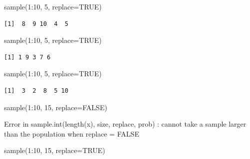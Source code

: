 \documentclass[
  letterpaper,
  DIV=11,
  numbers=noendperiod]{scrreprt}
\newenvironment{Shaded}{\begin{snugshade}}{\end{snugshade}}
\newcommand{\AttributeTok}[1]{\textcolor[rgb]{0.40,0.45,0.13}{#1}}
\newcommand{\ConstantTok}[1]{\textcolor[rgb]{0.56,0.35,0.01}{#1}}
\newcommand{\DecValTok}[1]{\textcolor[rgb]{0.68,0.00,0.00}{#1}}
\newcommand{\FunctionTok}[1]{\textcolor[rgb]{0.28,0.35,0.67}{#1}}
\newcommand{\NormalTok}[1]{\textcolor[rgb]{0.00,0.23,0.31}{#1}}
\newcommand{\SpecialCharTok}[1]{\textcolor[rgb]{0.37,0.37,0.37}{#1}}
\begin{document}
\begin{Shaded}
\begin{Highlighting}[]
\FunctionTok{sample}\NormalTok{(}\DecValTok{1}\SpecialCharTok{:}\DecValTok{10}\NormalTok{, }\DecValTok{5}\NormalTok{, }\AttributeTok{replace=}\ConstantTok{TRUE}\NormalTok{)}
\end{Highlighting}
\end{Shaded}

\begin{verbatim}
[1]  8  9 10  4  5
\end{verbatim}

\begin{Shaded}
\begin{Highlighting}[]
\FunctionTok{sample}\NormalTok{(}\DecValTok{1}\SpecialCharTok{:}\DecValTok{10}\NormalTok{, }\DecValTok{5}\NormalTok{, }\AttributeTok{replace=}\ConstantTok{TRUE}\NormalTok{)}
\end{Highlighting}
\end{Shaded}

\begin{verbatim}
[1] 1 9 3 7 6
\end{verbatim}

\begin{Shaded}
\begin{Highlighting}[]
\FunctionTok{sample}\NormalTok{(}\DecValTok{1}\SpecialCharTok{:}\DecValTok{10}\NormalTok{, }\DecValTok{5}\NormalTok{, }\AttributeTok{replace=}\ConstantTok{TRUE}\NormalTok{)}
\end{Highlighting}
\end{Shaded}

\begin{verbatim}
[1]  3  2  8  5 10
\end{verbatim}

\begin{Shaded}
\begin{Highlighting}[]
\FunctionTok{sample}\NormalTok{(}\DecValTok{1}\SpecialCharTok{:}\DecValTok{10}\NormalTok{, }\DecValTok{15}\NormalTok{, }\AttributeTok{replace=}\ConstantTok{FALSE}\NormalTok{)}
\end{Highlighting}
\end{Shaded}

{Error in sample.int(length(x), size, replace, prob) : cannot take a
sample larger than the population when \textquotesingle replace =
FALSE\textquotesingle{}}

\begin{Shaded}
\begin{Highlighting}[]
\FunctionTok{sample}\NormalTok{(}\DecValTok{1}\SpecialCharTok{:}\DecValTok{10}\NormalTok{, }\DecValTok{15}\NormalTok{, }\AttributeTok{replace=}\ConstantTok{TRUE}\NormalTok{)}
\end{Highlighting}
\end{Shaded}
\end{document}
